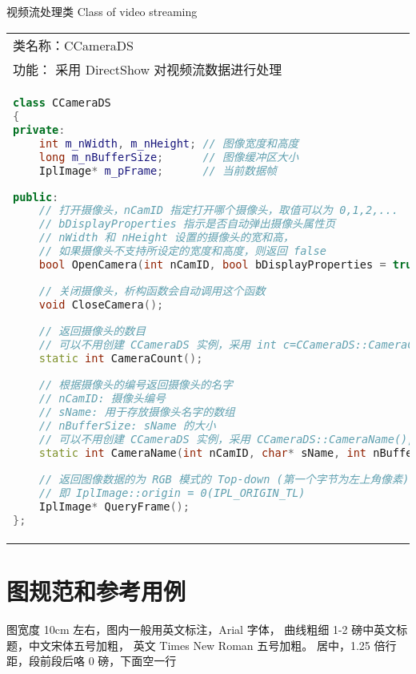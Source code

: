 \documentclass[12pt]{zjutthesis}
\begin{document}
\begin{table}[htp]
  \centering
  \bicaption
    {视频流处理类}
    {Class of video streaming}
  \begin{tabular}{|p{}|}
    \hline
    类名称：CCameraDS                                                                                        \\
    功能： 采用 DirectShow 对视频流数据进行处理                                                                         \\
    \hline
    \begin{lstlisting}[language=C++]
class CCameraDS
{
private:
    int m_nWidth, m_nHeight; // 图像宽度和高度
    long m_nBufferSize;      // 图像缓冲区大小
    IplImage* m_pFrame;      // 当前数据帧

public:
    // 打开摄像头，nCamID 指定打开哪个摄像头，取值可以为 0,1,2,...
    // bDisplayProperties 指示是否自动弹出摄像头属性页
    // nWidth 和 nHeight 设置的摄像头的宽和高，
    // 如果摄像头不支持所设定的宽度和高度，则返回 false
    bool OpenCamera(int nCamID, bool bDisplayProperties = true, int nWidth = 640, int nHeight = 480);

    // 关闭摄像头，析构函数会自动调用这个函数
    void CloseCamera();

    // 返回摄像头的数目
    // 可以不用创建 CCameraDS 实例，采用 int c=CCameraDS::CameraCount();得到结果。
    static int CameraCount();

    // 根据摄像头的编号返回摄像头的名字
    // nCamID: 摄像头编号
    // sName: 用于存放摄像头名字的数组
    // nBufferSize: sName 的大小
    // 可以不用创建 CCameraDS 实例，采用 CCameraDS::CameraName();得到结果。
    static int CameraName(int nCamID, char* sName, int nBufferSize);

    // 返回图像数据的为 RGB 模式的 Top-down (第一个字节为左上角像素)
    // 即 IplImage::origin = 0(IPL_ORIGIN_TL)
    IplImage* QueryFrame();
};
    \end{lstlisting} \\
    \hline
  \end{tabular}
\end{table}


\section{图规范和参考用例}
图宽度 10cm 左右，图内一般用英文标注，Arial 字体，
曲线粗细 1-2 磅中英文标题，中文宋体五号加粗，
英文 Times New Roman 五号加粗。
居中，1.25 倍行距，段前段后咯 0 磅，下面空一行
\end{document}
